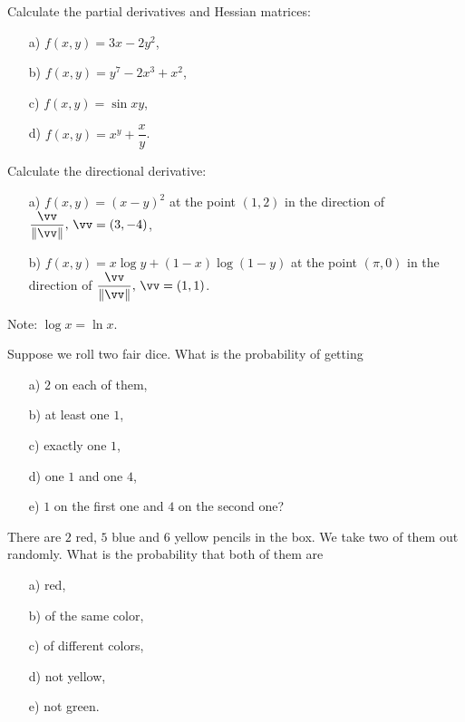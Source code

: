 \begin{problem}
Calculate the partial derivatives and Hessian matrices:
\begin{enumerate}
        \item[a) ] $f(x,y)=3x-2y^2$,
        \item[b) ] $f(x,y)=y^7-2x^3+x^2$,
        \item[c) ] $f(x,y)=\sin{xy}$,
        \item[d) ] $f(x,y)=x^y+\dfrac{x}{y}$.
    \end{enumerate}
\end{problem}
\bigskip
\begin{problem}
Calculate the directional derivative:
\begin{enumerate}
        \item[a) ] $f(x, y) = (x-y)^2$ at the point $(1, 2)$ in the direction of $\dfrac{\vv}{\|\vv\|},\,\vv = (3,-4)$,
        \item[b) ] $f(x, y) = x \log y + (1-x) \log (1-y)$ at the point $(\pi, 0)$ in the direction of $\dfrac{\vv}{\|\vv\|},\,\vv = (1,1)$.
    \end{enumerate}

{\small Note: $\log x=\ln x$.}
    
\end{problem}

\bigskip


\begin{problem}
Suppose we roll two fair dice. What is the probability of getting
\begin{enumerate}
    \item[a) ] $2$ on each of them,
    \item[b) ] at least one $1$,
    \item[c) ] exactly one $1$,
    \item[d) ] one $1$ and one $4$,
    \item[e) ] $1$ on the first one and $4$ on the second one?
\end{enumerate}
\end{problem}
\bigskip

\begin{problem}
There are $2$ red, $5$ blue and $6$ yellow pencils in the box. We take two of them out randomly. What is the probability that both of them are
\begin{enumerate}
    \item[a) ] red,
    \item[b) ] of the same color,
    \item[c) ] of different colors,
    \item[d) ] not yellow,
    \item[e) ] not green.
\end{enumerate}
\end{problem}

